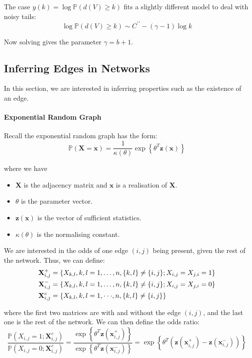\documentclass{article}
\begin{document}
The case $y(k) = \log \mathbb{P}(d(V)\geq k)$ fits a slightly different model to deal with noisy tails:
\begin{equation*}
    \log\mathbb{P}(d(V)\geq k)\sim C^{\prime\prime}-(\gamma-1)\log k
\end{equation*}

Now solving  gives the parameter $\gamma=b+1$.

\subsection{Inferring Edges in Networks}

In this section, we are interested in inferring properties such as the existence of an edge.
\paragraph{Exponential Random Graph}
Recall the exponential random graph has the form:
\begin{equation*}
    \mathbb{P}(\mathbf{X}=\mathbf{x})={\frac{1}{\kappa(\theta)}}\exp\left\{\theta^{T}\mathbf{z}(\mathbf{x})\right\}
\end{equation*}

where we have 
\begin{itemize}
    \item $\mathbf{X}$ is the adjacency matrix and $\mathbf{x}$ is a realisation of $\mathbf{X}$.
    \item $\theta$ is the parameter vector.
    \item $\mathbf{z}(\mathbf{x})$ is the vector of sufficient statistics.
    \item $\kappa(\theta)$ is the normalising constant.
\end{itemize}
We are interested in the odds of one edge $(i,j)$ being present, given the rest of the network. Thus, we can define:
\begin{align*}
    {\bf X}_{i,j}^{+}&=\{X_{k,l},k,l=1,\dots,n,\{k,l\}\neq\{i,j\};X_{i,j}=X_{j,i}=1\}\\
    {\bf X}_{i,j}^{-}&=\{X_{k,l},k,l=1,\dots,n,\{k,l\}\ne\{i,j\};X_{i,j}=X_{j,i}=0\}\\
    \mathbf{X}_{i,j}^{c}&=\{X_{k,l},k,l=1,\cdot\cdot\cdot,n,\{k,l\}\neq\{i,j\}\}
\end{align*}

where the first two matrices are with and without the edge $(i,j)$, and the last one is the rest of the network. We can then define the odds ratio:  
\begin{equation*}
    \frac{\mathbb{P}(X_{i,j}=1;\mathbf{X}_{i,j}^{c})}{\mathbb{P}(X_{i,j}=0;\mathbf{X}_{i,j}^{c})}=\frac{\exp\left\{\theta^{T}\mathbf{z}(\mathbf{x}_{i,j}^{+})\right\}}{\exp\left\{\theta^{T}\mathbf{z}(\mathbf{x}_{i,j}^{-})\right\}}=\exp\left\{\theta^{T}\left(\mathbf{z}(\mathbf{x}_{i,j}^{+})-\mathbf{z}(\mathbf{x}_{i,j}^{-})\right)\right\}
\end{equation*}
\end{document}
